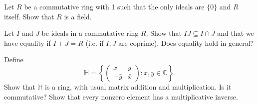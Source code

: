 \documentclass[answers]{exam}
\begin{document}
\begin{questions}



\question%
Let $R$ be a commutative ring with 1 such that the only ideals are $\{0\}$ and $R$ itself. Show that $R$ is a field.



\question%
Let $I$ and $J$ be ideals in a commutative ring $R$. Show that $I J \subseteq I \cap J$ and that we have equality if $I+J=R$ (i.e. if $I, J$ are coprime). Does equality hold in general?



\question%
Define \[
	\mathbb{H}=\left\{\begin{pmatrix}
		x & y \\
		-\bar{y} & \bar{x}
	\end{pmatrix}: x, y \in \mathbb{C}\right\}.
\] Show that $\mathbb{H}$ is a ring, with usual matrix addition and multiplication. Is it commutative? Show that every nonzero element has a multiplicative inverse.



\question%

\end{questions}
\end{document}
